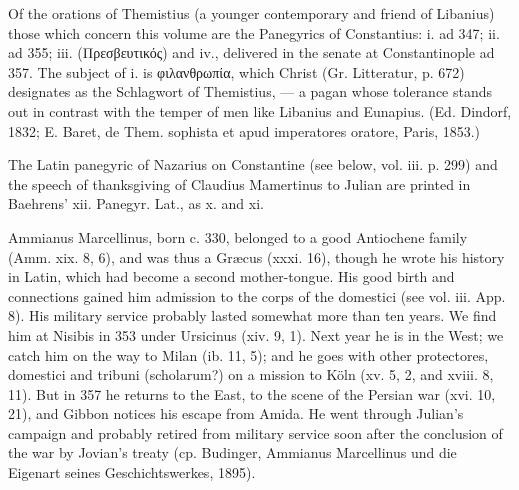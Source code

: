 Of the orations of Themistius (a younger contemporary and friend of Libanius) those which concern this volume are the Panegyrics of Constantius: i. ad 347; ii. ad 355; iii. (\textgreek{Πρεσβευτικός}) and iv., delivered in the senate at Constantinople ad 357. The subject of i. is \textgreek{φιλανθρωπία}, which Christ (Gr. Litteratur, p. 672) designates as the Schlagwort of Themistius, \texthebrew{—} a pagan whose tolerance stands out in contrast with the temper of men like Libanius and Eunapius. (Ed. Dindorf, 1832; E. Baret, de Them. sophista et apud imperatores oratore, Paris, 1853.)

The Latin panegyric of Nazarius on Constantine (see below, vol. iii. p. 299) and the speech of thanksgiving of Claudius Mamertinus to Julian are printed in Baehrens\texthebrew{}’ xii. Panegyr. Lat., as x. and xi.

Ammianus Marcellinus, born c. 330, belonged to a good Antiochene family (Amm. xix. 8, 6), and was thus a Græcus (xxxi. 16), though he wrote his history in Latin, which had become a second mother-tongue. His good birth and connections gained him admission to the corps of the domestici (see vol. iii. App. 8). His military service probably lasted somewhat more than ten years. We find him at Nisibis in 353 under Ursicinus (xiv. 9, 1). Next year he is in the West; we catch him on the way to Milan (ib. 11, 5); and he goes with other protectores, domestici and tribuni (scholarum?) on a mission to Köln (xv. 5, 2, and xviii. 8, 11). But in 357 he returns to the East, to the scene of the Persian war (xvi. 10, 21), and Gibbon notices his escape from Amida. He went through Julian\texthebrew{}’s campaign and probably retired from military service soon after the conclusion of the war by Jovian\texthebrew{}’s treaty (cp. Budinger, Ammianus Marcellinus und die Eigenart seines Geschichtswerkes, 1895).

